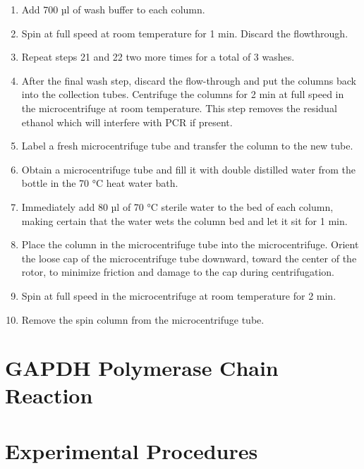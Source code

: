\documentclass[]{book}
\providecommand{\tightlist}{%
  \setlength{\itemsep}{0pt}\setlength{\parskip}{0pt}}
\begin{document}
\begin{enumerate}
\def\labelenumi{\arabic{enumi}.}
\setcounter{enumi}{20}
\tightlist
\item
  Add 700 µl of wash buffer to each column.
\item
  Spin at full speed at room temperature for 1 min. Discard the flowthrough.
\item
  Repeat steps 21 and 22 two more times for a total of 3 washes.
\item
  After the final wash step, discard the flow-through and put the columns back into the collection tubes. Centrifuge the columns for 2 min at full speed in the microcentrifuge at room temperature. This step removes the residual ethanol which will interfere with PCR if present.
\item
  Label a fresh microcentrifuge tube and transfer the column to the new tube.
\item
  Obtain a microcentrifuge tube and fill it with double distilled water from the bottle in the 70 °C heat water bath.
\item
  Immediately add 80 µl of 70 °C sterile water to the bed of each column, making certain that the water wets the column bed and let it sit for 1 min.
\item
  Place the column in the microcentrifuge tube into the microcentrifuge. Orient the loose cap of the microcentrifuge tube downward, toward the center of the rotor, to minimize friction and damage to the cap during centrifugation.
\item
  Spin at full speed in the microcentrifuge at room temperature for 2 min.
\item
  Remove the spin column from the microcentrifuge tube.
\end{enumerate}

\hypertarget{gapdh-polymerase-chain-reaction}{%
\section{GAPDH Polymerase Chain Reaction}\label{gapdh-polymerase-chain-reaction}}

\hypertarget{experimental-procedures-9}{%
\section{Experimental Procedures}\label{experimental-procedures-9}}
\end{document}

